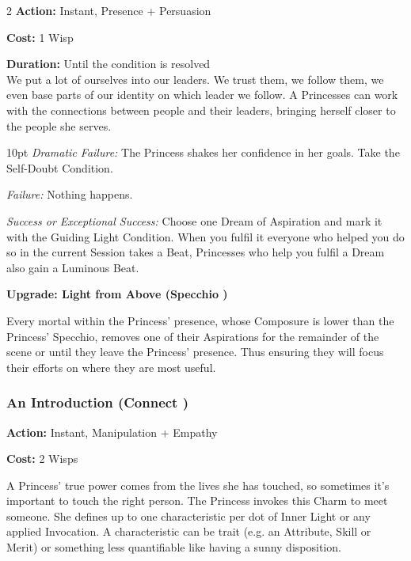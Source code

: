 \begin{multicols}{2}
\noindent \textbf{Action:} Instant, Presence + Persuasion

\noindent \textbf{Cost:} 1 Wisp

\noindent \textbf{Duration:} Until the condition is resolved \\

\noindent We put a lot of ourselves into our leaders. We trust them, we follow them, we even base parts of our identity on which leader we follow. A Princesses can work with the connections between people and their leaders, bringing herself closer to the people she serves. 

\begin{myindentpar}{10pt}
    \emph{Dramatic Failure:} The Princess shakes her confidence in her goals. Take the Self-Doubt Condition. 
    
    \emph{Failure:} Nothing happens. 
    
    \emph{Success or Exceptional Success:} Choose one Dream of Aspiration and mark it with the Guiding Light Condition. When you fulfil it everyone who helped you do so in the current Session takes a Beat, Princesses who help you fulfil a Dream also gain a Luminous Beat. 
	
	 \textbf{Upgrade: Light from Above (Specchio \textbullet\textbullet\textbullet)}
    
     Every mortal within the Princess' presence, whose Composure is lower than the Princess' Specchio, removes one of their Aspirations for the remainder of the scene or until they leave the Princess' presence. Thus ensuring they will focus their efforts on where they are most useful. 
    
\end{myindentpar}

\subsubsection*{An Introduction (Connect \textbullet\textbullet\textbullet)}

\noindent \textbf{Action:} Instant, Manipulation + Empathy

\noindent \textbf{Cost:} 2 Wisps

\noindent A Princess' true power comes from the lives she has touched, so sometimes it's important to touch the right person. The Princess invokes this Charm to meet someone. She defines up to one characteristic per dot of Inner Light or any applied Invocation. A characteristic can be trait (e.g. an Attribute, Skill or Merit) or something less quantifiable like having a sunny disposition. 


\end{multicols}
